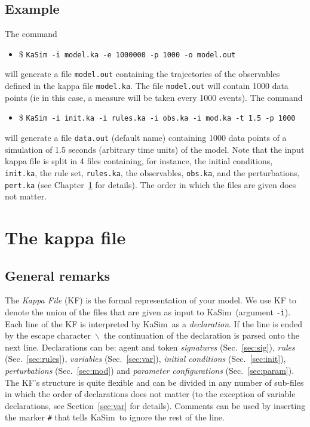 \documentclass[11pt]{book}
\def\KaSim{\textsf{KaSim}}
\def\ttt#1{\texttt{#1}}
\def\bs{\backslash}
\def\ie{ie }
\def\ITE#1{\begin{itemize}#1\end{itemize}}
\begin{document}
\section*{Example}
The command 
\ITE{
\item[\$] \ttt{KaSim -i model.ka -e 1000000 -p 1000 -o model.out}  
}
will generate a file \ttt{model.out} containing the trajectories of the observables defined in the kappa file \ttt{model.ka}. The file \ttt{model.out} will contain 1000 data points (\ie in this case, a measure will be taken every 1000 events). The command
\ITE{
\item[\$] \ttt{KaSim -i init.ka -i rules.ka -i obs.ka -i mod.ka -t 1.5 -p 1000}  
}
will generate a file \ttt{data.out} (default name) containing 1000 data points of a simulation of 1.5 seconds (arbitrary time units) of the model. Note that the input kappa file is split in 4 files containing, for instance, the initial conditions, \ttt{init.ka}, the rule set, \ttt{rules.ka}, the observables, \ttt{obs.ka}, and the perturbations, \ttt{pert.ka} (see Chapter~\ref{chap:kappa} for details). The order in which the files are given does not matter.

\chapter{The kappa file}\label{chap:kappa}

\section{General remarks}
The \emph{Kappa File} (KF) is the formal representation of your model. We use KF to denote the union of the files that are given as input to \KaSim~(argument \ttt{-i}). Each line of the KF is interpreted by \KaSim~as a \emph{declaration}. If the line is ended by the escape character~\textquotesingle \ttt{$\bs$}\textquotesingle ~the continuation of the declaration is parsed onto the next line. Declarations can be: agent and token \emph{signatures} (Sec.~\ref{sec:sig}), \emph{rules} (Sec.~\ref{sec:rules}), \emph{variables} (Sec.~\ref{sec:var}), \emph{initial conditions} (Sec.~\ref{sec:init}), \emph{perturbations} (Sec.~\ref{sec:mod}) and \emph{parameter configurations} (Sec.~\ref{sec:param}). The KF's structure is quite flexible and can be divided in any number of sub-files in which the order of declarations does not matter (to the exception of variable declarations, see Section~\ref{sec:var} for details). Comments can be used by inserting the marker \ttt{\#} that tells \KaSim~to ignore the rest of the line. 
\end{document}
